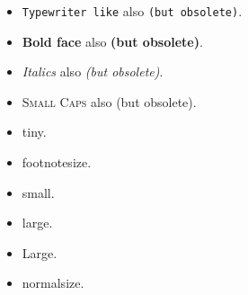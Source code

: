 \begin{itemize}
\item \texttt{Typewriter like} also {\tt (but obsolete)}.
\item \textbf{Bold face} also {\bf (but obsolete)}.
\item \textit{Italics} also {\it (but obsolete)}.
\item \textsc{Small Caps} also {\sc (but obsolete)}.
\item \tiny tiny.
\item \footnotesize footnotesize.
\item \small small.
\item \large large.
\item \Large Large.
\item \normalsize normalsize.
\end{itemize}

